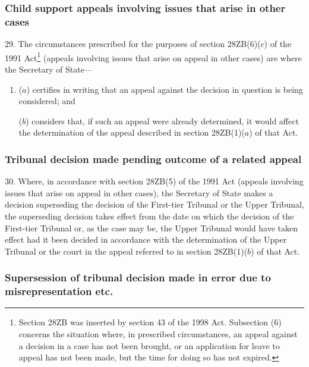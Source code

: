 \documentclass[12pt,a4paper]{article}
\begin{document}
\subsubsection[29. Child support appeals involving issues that arise in other cases]{Child support appeals involving issues that arise in other cases}

29.  The circumstances prescribed for the purposes of section 28ZB(6)($c$)  of the 1991 Act\footnote{Section 28ZB was inserted by section 43 of the 1998 Act. Subsection (6) concerns the situation where, in prescribed circumstances, an appeal against a decision in a case has not been brought, or an application for leave to appeal has not been made, but the time for doing so has not expired.} (appeals involving issues that arise on appeal in other cases) are where the Secretary of State—
\begin{enumerate}\item[]
($a$) certifies in writing that an appeal against the decision in question is being considered; and

($b$) considers that, if such an appeal were already determined, it would affect the determination of the appeal described in section 28ZB(1)($a$)  of that Act.
\end{enumerate}

\subsubsection[30. Tribunal decision made pending outcome of a related appeal]{Tribunal decision made pending outcome of a related appeal}

30.  Where, in accordance with section 28ZB(5) of the 1991 Act (appeals involving issues that arise on appeal in other cases), the Secretary of State makes a decision superseding the decision of the First-tier Tribunal or the Upper Tribunal, the superseding decision takes effect from the date on which the decision of the First-tier Tribunal or, as the case may be, the Upper Tribunal would have taken effect had it been decided in accordance with the determination of the Upper Tribunal or the court in the appeal referred to in section 28ZB(1)($b$)  of that Act.

\subsubsection[31. Supersession of tribunal decision made in error due to misrepresentation etc.]{Supersession of tribunal decision made in error due to misrepresentation etc.}
\end{document}
